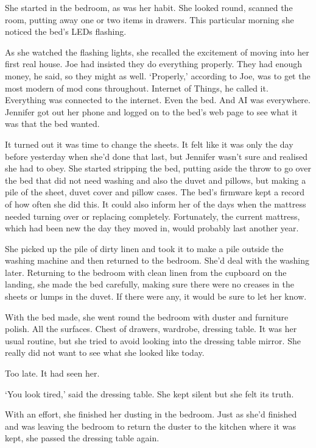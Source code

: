 She started in the bedroom, as was her habit. 
She looked round, scanned the room, putting away one or two 
items in drawers. This particular morning she noticed the bed's 
LEDs flashing.

As she watched the flashing lights, she recalled the excitement of 
moving into her first real house. Joe had insisted they do 
everything properly. They had enough money, he said, so they might 
as well. `Properly,' according to Joe, was to get the most modern 
of mod cons throughout. Internet of Things, he called it. 
Everything was connected to the internet. Even the bed. And AI 
was everywhere. Jennifer got out her phone and logged on to the 
bed's web page to see what it was that the bed wanted.

It turned out it was time to change the sheets. It felt like it was
only the day before yesterday when she'd done that last, but Jennifer
wasn't sure and realised she had to obey. She started stripping the
bed, putting aside the throw to go over the bed that did not need
washing and also the duvet and pillows, but making a pile of the
sheet, duvet cover and pillow cases. The bed's firmware kept a record
of how often she did this. It could also inform her of the days when
the mattress needed turning over or replacing completely.
Fortunately, the current mattress, which had been new the day they
moved in, would probably last another year.

She picked up the pile of dirty linen and took it to make a pile 
outside the washing machine and then returned to the bedroom. She'd 
deal with the washing later. Returning to the bedroom with clean 
linen from the cupboard on the landing, she made the bed carefully, 
making sure there were no creases in the sheets or lumps in the 
duvet. If there were any, it would be sure to let her know.

With the bed made, she went round the bedroom with duster and 
furniture polish. All the surfaces. Chest of drawers, wardrobe, 
dressing table. It was her usual routine, but she tried to avoid 
looking into the dressing table mirror. She really did not want to 
see what she looked like today.

Too late. It had seen her.

`You look tired,' said the dressing table. She kept silent but she 
felt its truth.

With an effort, she finished her dusting in the bedroom. Just as 
she'd finished and was leaving the bedroom to return the duster to 
the kitchen where it was kept, she passed the dressing table again.

